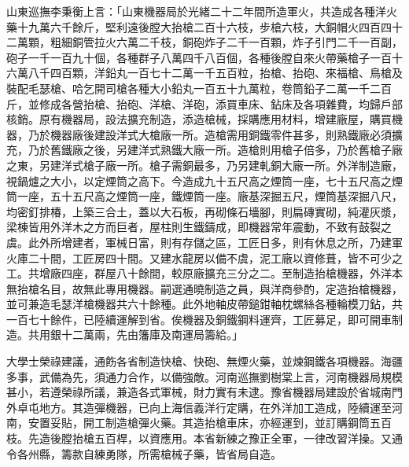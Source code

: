 \begin{pinyinscope}
山東巡撫李秉衡上言：「山東機器局於光緒二十二年間所造軍火，共造成各種洋火藥十九萬六千餘斤，堅利遠後膛大抬槍二百十六枝，步槍六枝，大銅帽火四百四十二萬顆，粗細銅管拉火六萬二千枝，銅砲炸子二千一百顆，炸子引門二千一百副，砲子一千一百九十個，各種群子八萬四千八百個，各種後膛自來火帶藥槍子一百十六萬八千四百顆，洋鉛丸一百七十二萬一千五百粒，抬槍、抬砲、來福槍、鳥槍及裝配毛瑟槍、哈乞開司槍各種大小鉛丸一百五十九萬粒，卷筒鉛子二萬一千二百斤，並修成各營抬槍、抬砲、洋槍、洋砲，添買車床、鉆床及各項雜費，均歸戶部核銷。原有機器局，設法擴充制造，添造槍械，採購應用材料，增建廠屋，購買機器，乃於機器廠後建設洋式大槍廠一所。造槍需用銅鐵零件甚多，則熟鐵廠必須擴充，乃於舊鐵廠之後，另建洋式熟鐵大廠一所。造槍則用槍子倍多，乃於舊槍子廠之東，另建洋式槍子廠一所。槍子需銅最多，乃另建軋銅大廠一所。外洋制造廠，視鍋爐之大小，以定煙筒之高下。今造成九十五尺高之煙筒一座，七十五尺高之煙筒一座，五十五尺高之煙筒一座，鐵煙筒一座。廠基深掘五尺，煙筒基深掘八尺，均密釘排椿，上築三合土，蓋以大石板，再砌條石墻腳，則扁磚實砌，純灌灰漿，梁棟皆用外洋木之方而巨者，屋柱則生鐵鑄成，即機器常年震動，不致有鼓裂之虞。此外所增建者，軍械日富，則有存儲之區，工匠日多，則有休息之所，乃建軍火庫二十間，工匠房四十間。又建水龍房以備不虞，泥工廠以資修葺，皆不可少之工。共增廠四座，群屋八十餘間，較原廠擴充三分之二。至制造抬槍機器，外洋本無抬槍名目，故無此專用機器。嗣選通曉制造之員，與洋商參酌，定造抬槍機器，並可兼造毛瑟洋槍機器共六十餘種。此外地軸皮帶鎚鉗軸枕螺絲各種輪模刀鉆，共一百七十餘件，已陸續運解到省。俟機器及銅鐵鋼料運齊，工匠募足，即可開車制造。共用銀十二萬兩，先由籓庫及南運局籌給。」

大學士榮祿建議，通飭各省制造快槍、快砲、無煙火藥，並煉鋼鐵各項機器。海疆多事，武備為先，須通力合作，以備強敵。河南巡撫劉樹棠上言，河南機器局規模甚小，若遵榮祿所議，兼造各式軍械，財力實有未逮。豫省機器局建設於省城南門外卓屯地方。其造彈機器，已向上海信義洋行定購，在外洋加工造成，陸續運至河南，安置妥貼，開工制造槍彈火藥。其造抬槍車床，亦經運到，並訂購鋼筒五百枝。先造後膛抬槍五百桿，以資應用。本省新練之豫正全軍，一律改習洋操。又通令各州縣，籌款自練勇隊，所需槍械子藥，皆省局自造。


\end{pinyinscope}
